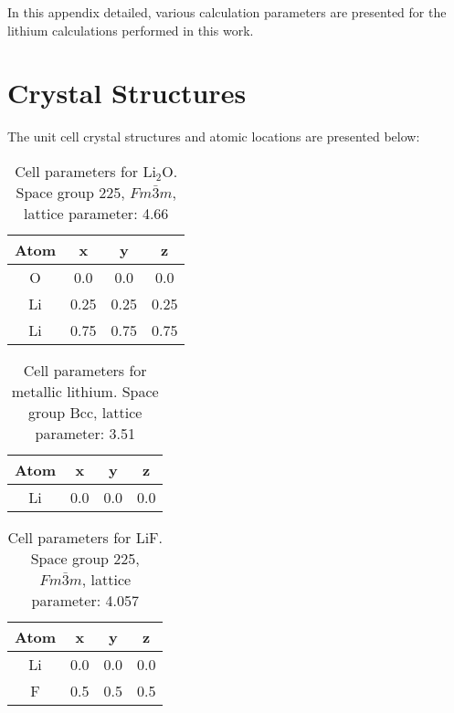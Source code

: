 In this appendix detailed, various calculation parameters are presented for the lithium calculations performed in this work.

\section{Crystal Structures}
The unit cell crystal structures and atomic locations are presented below:

\begin{table}[H]

	\centering
	\caption{Cell parameters for $ \mathrm{Li_2O}$.  Space group 225, $ Fm\bar{3}m $, lattice parameter: 4.66\angstrom }
	\begin{tabular}{cccc}
		Atom	& x	& y	& z				\\
		\hline
		O	& 0.0	&0.0	&0.0	\\
		Li 	& 0.25	&0.25	&0.25	\\
		Li 	& 0.75	&0.75	&0.75	\\
	\end{tabular} 
\end{table}

\begin{table}[H]
	\centering
	\caption{Cell parameters for metallic lithium.  Space group Bcc, lattice parameter: 3.51\angstrom }
	\begin{tabular}{cccc}
		Atom	& x	& y	& z				\\
		\hline
		Li	& 0.0	&0.0	&0.0	
	\end{tabular} 
\end{table}


\begin{table}
	\centering
	\caption{Cell parameters for LiF.  Space group 225, $ Fm\bar{3}m $, lattice parameter: 4.057\angstrom }
	\begin{tabular}{cccc}
		Atom	& x	& y	& z				\\
		\hline
		Li	& 0.0	&0.0	&0.0	\\
		F 	& 0.5	&0.5	&0.5	\\
	\end{tabular} 
\end{table}

